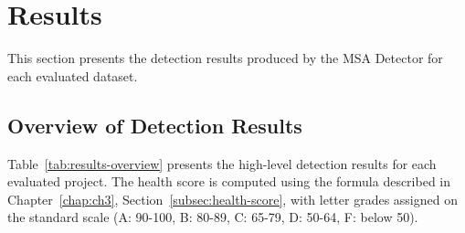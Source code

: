 \section{Results}
\label{sec:results}

\par This section presents the detection results produced by the MSA Detector for each evaluated dataset.

\subsection{Overview of Detection Results}
\label{subsec:results-overview}

\par Table~\ref{tab:results-overview} presents the high-level detection results for each evaluated project. The health score is computed using the formula described in Chapter~\ref{chap:ch3}, Section~\ref{subsec:health-score}, with letter grades assigned on the standard scale (A: 90-100, B: 80-89, C: 65-79, D: 50-64, F: below 50).


